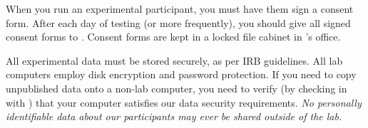 \documentclass{tufte-book} %
\begin{document}
   
\noindent
   When you run an experimental participant, you must have them sign a
   consent form.  After each day of testing (or more frequently), you
   should give all signed consent forms to \coordinator.  Consent
   forms are kept in a locked file cabinet in \director's office.

   All experimental data must be stored securely, as per IRB
   guidelines.  All lab computers employ disk encryption and password
   protection.  If you need to copy unpublished data onto a non-lab
   computer, you need to verify (by checking in with \director) that
   your computer satisfies our data security requirements.  \textit{No
     personally identifiable data about our participants may ever be
     shared outside of the lab.}
\end{document}
